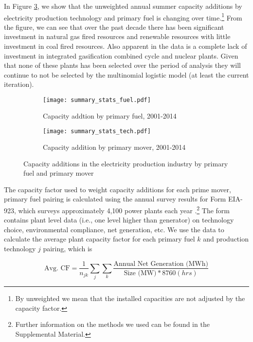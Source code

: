 \documentclass[10pt]{amsart}
\begin{document}
In Figure \ref{fig:techfuelcapacityadds}, we show that the unweighted annual summer capacity additions by electricity production technology and primary fuel is changing over time.\footnote{By unweighted we mean that the installed capacities are not adjusted by the capacity factor.} 
From the figure, we can see that over the past decade there has been significant investment in natural gas fired resources and renewable resources with little investment in coal fired resources. 
Also apparent in the data is a complete lack of investment in integrated gasification combined cycle and nuclear  plants. 
Given that none of these plants has been selected over the period of analysis they will continue to not be selected by the multinomial logistic model (at least the current iteration).  

\begin{figure}[H]
\begin{subfigure}[b]{0.4\textwidth}
\texttt{[image: summary\_stats\_fuel.pdf]}
\label{fig:fuelcapacityadds}
\caption{Capacity addtion by primary fuel, 2001-2014}
\end{subfigure}
\hfill
\begin{subfigure}[b]{0.4\textwidth}
\texttt{[image: summary\_stats\_tech.pdf]}
\label{fig:techcapacityadds}
\caption{Capacity addition by primary mover, 2001-2014}
\end{subfigure}
\caption{Capacity additions in the electricity production industry by primary fuel and primary mover \parencite{eiaform860}}
\label{fig:techfuelcapacityadds}
\end{figure}
  
The capacity factor used to weight capacity additions for each prime mover, primary fuel pairing is calculated using the annual survey results for Form EIA-923, which surveys approximately 4,100 power plants each year \parencite{eiaform923}.\footnote{Further information on the methods we used can be found in the Supplemental Material.} 
The form contains plant level data (i.e., one level higher than generator) on technology choice, environmental compliance, net generation, etc.
We use the data to calculate the average plant capacity factor for each primary fuel $k$ and production technology $j$ pairing, which is 

\begin{equation}
\text{Avg. CF} = \frac{1}{n_{jk}} \sum_{j} \sum_{k} \frac{\text{Annual Net Generation (MWh)}}{\text{Size (MW)}*8760 (hrs)}
\end{equation}
\end{document}
